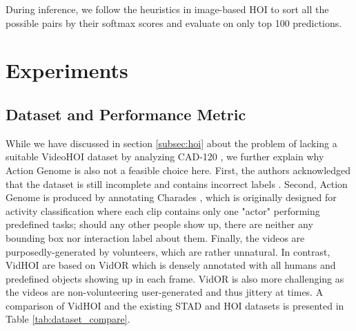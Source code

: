 \documentclass[sigconf]{acmart}
\begin{document}
During inference, we follow the heuristics in image-based HOI \cite{chao2018learning} to sort all the possible pairs by their softmax scores and evaluate on only top 100 predictions.



\section{Experiments}
\label{sec:experiments}

\subsection{Dataset and Performance Metric}
\label{subsec:dataset}

While we have discussed in section \ref{subsec:hoi} about the problem of lacking a suitable VideoHOI dataset by analyzing CAD-120 \cite{koppula2013learning}, we further explain why Action Genome \cite{ji2020action} is also not a feasible choice here.
First, the authors acknowledged that the dataset is still incomplete and contains incorrect labels \cite{ji_2020}.
Second, Action Genome is produced by annotating Charades \cite{sigurdsson2016hollywood}, which is originally designed for activity classification where each clip contains only one "actor" performing predefined tasks; should any other people show up, there are neither any bounding box nor interaction label about them.
Finally, the videos are purposedly-generated by volunteers, which are rather unnatural. 
In contrast, VidHOI are based on VidOR \cite{shang2019annotating} which is densely annotated with all humans and predefined objects showing up in each frame.
VidOR is also more challenging as the videos are non-volunteering user-generated and thus jittery at times.
A comparison of VidHOI and the existing STAD and HOI datasets is presented in Table \ref{tab:dataset_compare}.
\end{document}
